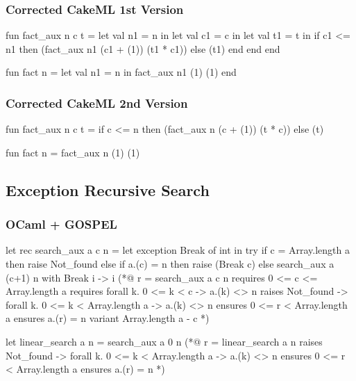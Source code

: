 \subsubsection*{Corrected CakeML 1st Version}

\begin{cakeml}
fun fact_aux n c t = let val n1 = n in
  let val c1 = c in
  let val t1 = t in
  if c1 <= n1 then (fact_aux n1 (c1 + (1)) (t1 * c1))  else (t1)
  end end end

fun fact n = let val n1 = n in fact_aux n1 (1) (1) end
\end{cakeml}

\subsubsection*{Corrected CakeML 2nd Version}

\begin{cakeml}
fun fact_aux n c t = 
  if c <= n then (fact_aux n (c + (1)) (t * c))  else (t)

fun fact n = fact_aux n (1) (1)
\end{cakeml}

\newpage

\subsection{Exception Recursive Search}
\label{subsec:Exception_Recursive_Search}

\subsubsection*{OCaml + GOSPEL}

\begin{gospell}
let rec search_aux a c n =
  let exception Break of int in try
    if c = Array.length a then raise Not_found 
    else if a.(c) = n then raise (Break c) 
    else search_aux a (c+1) n
  with Break i -> i
(*@
  r = search_aux a c n
  requires 0 <= c <= Array.length a
  requires forall k. 0 <= k < c -> a.(k) <> n
  raises Not_found -> forall k. 0 <= k < Array.length a -> a.(k) <> n
  ensures 0 <= r < Array.length a
  ensures a.(r) = n
  variant Array.length a - c
*)

let linear_search a n = search_aux a 0 n
(*@
  r = linear_search a n
  raises Not_found -> forall k. 0 <= k < Array.length a -> a.(k) <> n
  ensures 0 <= r < Array.length a
  ensures a.(r) = n
*)
\end{gospell}

